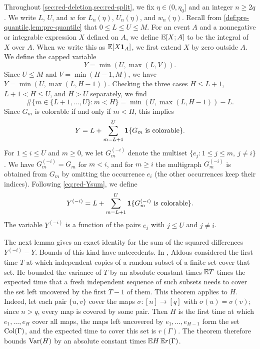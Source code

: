 Throughout \cref{sec:red-deletion,sec:red-split}, we fix $\eta \in (0, \eta_0]$ and an integer $n \ge 2q$. We write $L$, $U$, and $w$ for $L_n(\eta)$, $U_n(\eta)$, and $w_n(\eta)$. Recall from \cref{def:pre-quantile,lem:pre-quantile} that $0 \le L \le U \le M$. For an event $A$ and a nonnegative or integrable expression $X$ defined on $A$, we define $\mathbb E[X; A]$ to be the integral of $X$ over $A$. When we write this as $\mathbb E[X\mathbf 1_A]$, we first extend $X$ by zero outside $A$. We define the capped variable
\begin{equation}\label{eq:red-Y}
Y = \min(U, \max(L, V)).
\end{equation}
Since $U \le M$ and $V = \min(H - 1, M)$, we have $Y = \min(U, \max(L, H - 1))$. Checking the three cases $H \le L + 1$, $L + 1 < H \le U$, and $H > U$ separately, we find
\begin{equation*}
\#\{m \in \{L + 1, \dots, U\} : m < H\} = \min(U, \max(L, H - 1)) - L.
\end{equation*}
Since $G_m$ is colorable if and only if $m < H$, this implies
\begin{equation}\label{eq:red-Ysum}
Y = L + \sum_{m = L + 1}^{U} \mathbf 1\{G_m \text{ is colorable}\}.
\end{equation}
For $1 \le i \le U$ and $m \ge 0$, we let $G_m^{(-i)}$ denote the multiset $\{e_j : 1 \le j \le m, \ j \ne i\}$. We have $G_m^{(-i)} = G_m$ for $m < i$, and for $m \ge i$ the multigraph $G_m^{(-i)}$ is obtained from $G_m$ by omitting the occurrence $e_i$ (the other occurrences keep their indices). Following \eqref{eq:red-Ysum}, we define
\begin{equation}\label{eq:red-Ydel}
Y^{(-i)} = L + \sum_{m = L + 1}^{U} \mathbf 1\{G_m^{(-i)} \text{ is colorable}\}.
\end{equation}
The variable $Y^{(-i)}$ is a function of the pairs $e_j$ with $j \le U$ and $j \ne i$.

The next lemma gives an exact identity for the sum of the squared differences $Y^{(-i)} - Y$. Bounds of this kind have antecedents. In \cite[Theorem~1(b)]{aldous1991threshold}, Aldous considered the first time $T$ at which independent copies of a random subset of a finite set cover that set. He bounded the variance of $T$ by an absolute constant times $\mathbb E T$ times the expected time that a fresh independent sequence of such subsets needs to cover the set left uncovered by the first $T - 1$ of them. This theorem applies to $H$. Indeed, let each pair $\{u, v\}$ cover the maps $\sigma \colon [n] \to [q]$ with $\sigma(u) = \sigma(v)$; since $n > q$, every map is covered by some pair. Then $H$ is the first time at which $e_1, \dots, e_H$ cover all maps, the maps left uncovered by $e_1, \dots, e_{H - 1}$ form the set $\operatorname{Col}(\Gamma)$, and the expected time to cover this set is $r(\Gamma)$. The theorem therefore bounds $\operatorname{Var}(H)$ by an absolute constant times $\mathbb E H \, \mathbb E r(\Gamma)$.

